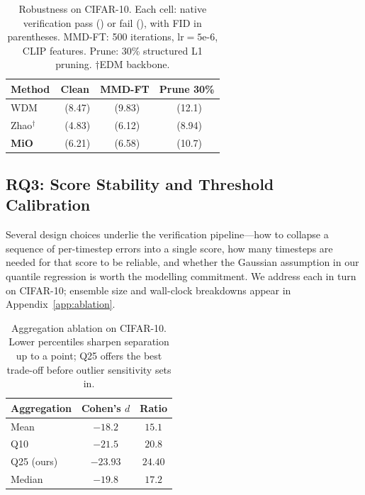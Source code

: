 \documentclass{article}
\newcommand{\cmark}{\ding{51}}
\newcommand{\xmark}{\ding{55}}
\begin{document}
\begin{table}[t]
\caption{Robustness on CIFAR-10.
Each cell: native verification pass (\cmark) or fail (\xmark),
with FID in parentheses.
MMD-FT: 500 iterations, lr${}=5\text{e-}6$, CLIP features.
Prune: 30\% structured L1 pruning.
$\dagger$EDM backbone.}
\label{tab:robustness}
\vskip 0.1in
\centering
\small
\begin{tabular}{@{}lccc@{}}
\toprule
Method & Clean & MMD-FT & Prune 30\% \\
\midrule
WDM            & \cmark~(8.47)  & \xmark~(9.83)  & \cmark~(12.1) \\
Zhao$^\dagger$ & \cmark~(4.83)  & \xmark~(6.12)  & \xmark~(8.94) \\
\textbf{MiO}   & \cmark~(6.21)  & \cmark~(6.58)  & \cmark~(10.7) \\
\bottomrule
\end{tabular}
\end{table}

\subsection{RQ3: Score Stability and Threshold Calibration}
\label{sec:ablation}

Several design choices underlie the verification pipeline---how to
collapse a sequence of per-timestep errors into a single score, how
many timesteps are needed for that score to be reliable, and whether
the Gaussian assumption in our quantile regression is worth the
modelling commitment.  We address each in turn on CIFAR-10; ensemble
size and wall-clock breakdowns appear in
Appendix~\ref{app:ablation}.

\begin{table}[t]
\caption{Aggregation ablation on CIFAR-10.  Lower percentiles
sharpen separation up to a point; Q25 offers the best trade-off
before outlier sensitivity sets in.}
\label{tab:aggregation}
\vskip 0.1in
\begin{center}
\begin{small}
\begin{tabular}{lcc}
\toprule
Aggregation & Cohen's $d$ & Ratio \\
\midrule
Mean & $-18.2$ & $15.1$ \\
Q10 & $-21.5$ & $20.8$ \\
Q25 (ours) & $\mathbf{-23.93}$ & $\mathbf{24.40}$ \\
Median & $-19.8$ & $17.2$ \\
\bottomrule
\end{tabular}
\end{small}
\end{center}
\vskip -0.1in
\end{table}
\end{document}
